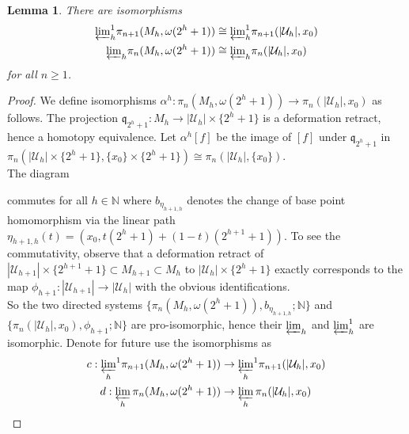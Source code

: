 \documentclass[a4paper,11pt]{article}
\theoremstyle{definition}
\theoremstyle{plain}
\newtheorem{lemma}[definition]{Lemma}
\theoremstyle{remark}
\begin{document}
{\begin{lemma} There are isomorphisms 
\begin{align*}
{\varprojlim}_{h}^1  \pi_{n+1}(M_h, \omega(2^h+1)) &\cong {\varprojlim}_{h}^1   \pi_{n+1}(|\mathcal{U}_{h}|,x_0)\\
{\varprojlim}_{h}  \pi_{n}(M_h, \omega(2^h+1)) &\cong {\varprojlim}_{h}   \pi_{n}(|\mathcal{U}_{h}|,x_0)
\end{align*}
for all $n\geq 1$. 
\end{lemma}

\begin{proof} We define isomorphisms $\alpha^{h}: \pi_{n}(M_h,\omega(2^h+1))\rightarrow \pi_{n}(|\mathcal{U}_{h}|,x_0)$ as follows. The projection $\mathfrak{q}_{2^{h}+1}: M_{h}\rightarrow |\mathcal{U}_{h}| \times \{2^h+1\}$ is a deformation retract, hence a homotopy equivalence. Let $\alpha^h[f]$ be the image of $[f]$ under $\mathfrak{q}_{2^{h}+1}$ in $\pi_{n}(|\mathcal{U}_{h}| \times \{2^h+1\}, \{x_0\} \times \{2^h+1\}) \cong \pi_{n}(|\mathcal{U}_{h}|, \{x_0\})$. \\

The diagram 


\begin{figure}[H]
\center
{}
\end{figure}

commutes for all $h\in \mathbb{N}$ where $b_{\eta_{h+1,h}}$ denotes the change of base point homomorphism via the linear path $\eta_{h+1,h}(t)= (x_0,t(2^h+1)+(1-t)(2^{h+1}+1))$. To see the commutativity, observe that a deformation retract of $|\mathcal{U}_{h+1}| \times \{2^{h+1}+1\} \subset M_{h+1} \subset M_{h}$ to $|\mathcal{U}_{h}| \times \{2^h+1\}$ exactly corresponds to the map $\phi_{h+1}: |\mathcal{U}_{h+1}| \rightarrow |\mathcal{U}_{h}|$ with the obvious identifications.\\

So the two directed systems $\{\pi_n(M_{h},\omega(2^h+1)), b_{\eta_{h+1,h}}; \mathbb{N} \}$ and $\{\pi_{n}(|\mathcal{U}_{h}|,x_0), \phi_{h+1}; \mathbb{N}\}$ are pro-isomorphic, hence their $\varprojlim_{h}$ and $\varprojlim^1_{h}$ are isomorphic. Denote for future use the isomorphisms as 
\begin{align*}
c:{\varprojlim_h}^1  \pi_{n+1}(M_h, \omega(2^h+1)) &\rightarrow {\varprojlim_h}^1   \pi_{n+1}(|\mathcal{U}_{h}|,x_0) \\
d: \varprojlim_{h} \pi_{n}(M_{h},\omega(2^h+1)) &\rightarrow \varprojlim_{h} \pi_{n}(|\mathcal{U}_{h}|,x_0)
\end{align*}
\end{proof}


}
\end{document}

